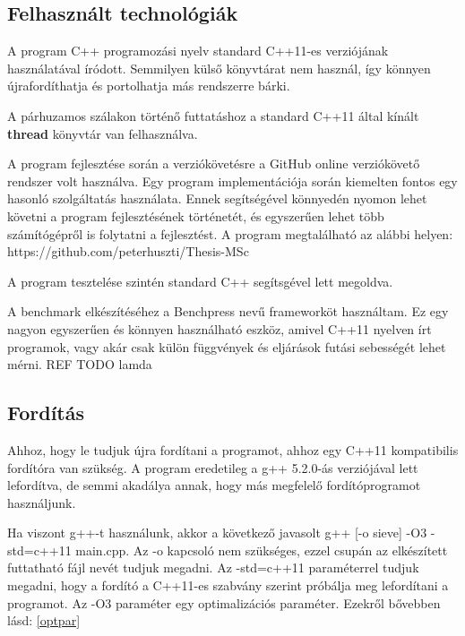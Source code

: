 \documentclass[twoside, a4paper, 12pt]{article}
\begin{document}
\subsection{Felhasznált technológiák}
A program C++ programozási nyelv standard C++11-es verziójának használatával íródott. Semmilyen külső könyvtárat nem használ, így könnyen újrafordíthatja és portolhatja más rendszerre bárki. \par
A párhuzamos szálakon történő futtatáshoz a standard C++11 által kínált \textbf{thread} könyvtár van felhasználva. \par
A program fejlesztése során a verziókövetésre a GitHub online verziókövető rendszer volt használva. Egy program implementációja során kiemelten fontos egy hasonló szolgáltatás használata. Ennek segítségével könnyedén nyomon lehet követni a program fejlesztésének történetét, és egyszerűen lehet több számítógépről is folytatni a fejlesztést. A program megtalálható az alábbi helyen: https://github.com/peterhuszti/Thesis-MSc \par \par \par

A program tesztelése szintén standard C++ segítsgével lett megoldva. \par
A benchmark elkészítéséhez a Benchpress nevű frameworköt használtam. Ez egy nagyon egyszerűen és könnyen használható eszköz, amivel C++11 nyelven írt programok, vagy akár csak külön függvények és eljárások futási sebességét lehet mérni. REF
TODO lamda \par

\subsection{Fordítás} \label{build}

Ahhoz, hogy le tudjuk újra fordítani a programot, ahhoz egy C++11 kompatibilis fordítóra van szükség. A program eredetileg a g++ 5.2.0-ás verziójával lett lefordítva, de semmi akadálya annak, hogy más megfelelő fordítóprogramot használjunk. \par
Ha viszont g++-t használunk, akkor a következő javasolt g++ [-o sieve] -O3 -std=c++11 main.cpp. Az -o kapcsoló nem szükséges, ezzel csupán az elkészített futtatható fájl nevét tudjuk megadni. Az -std=c++11 paraméterrel tudjuk megadni, hogy a fordító a C++11-es szabvány szerint próbálja meg lefordítani a programot. Az -O3 paraméter egy optimalizációs paraméter. Ezekről bővebben lásd: \ref{optpar}
\end{document}
